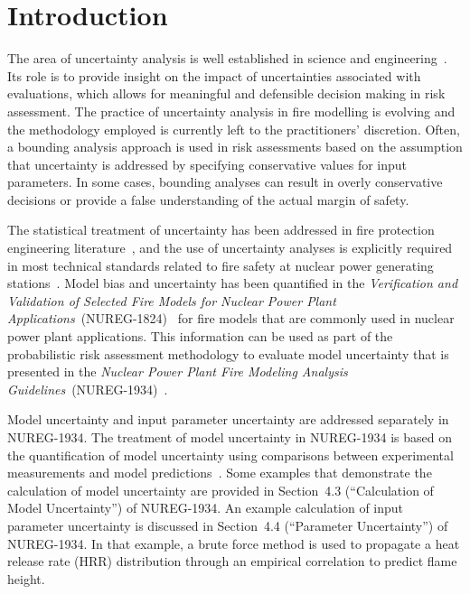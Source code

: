 \documentclass[12pt]{article}
\begin{document}
\section{Introduction}
\label{sec:introduction}

The area of uncertainty analysis is well established in science and engineering~\cite{Morgan, Spiegel, Vose, Kumamoto, Haimes}. Its role is to provide insight on the impact of uncertainties associated with evaluations, which allows for meaningful and defensible decision making in risk assessment. The practice of uncertainty analysis in fire modelling is evolving and the methodology employed is currently left to the practitioners' discretion. Often, a bounding analysis approach is used in risk assessments based on the assumption that uncertainty is addressed by specifying conservative values for input parameters. In some cases, bounding analyses can result in overly conservative decisions or provide a false understanding of the actual margin of safety. 

The statistical treatment of uncertainty has been addressed in fire protection engineering literature~\cite{Notarianni:SFPE, McGrattan2011a, Notarianni:1999, Lundin, Hostikka:2003a, Upadhyay2008}, and the use of uncertainty analyses is explicitly required in most technical standards related to fire safety at nuclear power generating stations~\cite{NFPA:805, NUREG:6850}. Model bias and uncertainty has been quantified in the \emph{Verification and Validation of Selected Fire Models for Nuclear Power Plant Applications}~(NUREG-1824)~\cite{NUREG_1824} for fire models that are commonly used in nuclear power plant applications. This information can be used as part of the probabilistic risk assessment methodology to evaluate model uncertainty that is presented in the \emph{Nuclear Power Plant Fire Modeling Analysis Guidelines}~(NUREG-1934)~\cite{NUREG_1934}. 

Model uncertainty and input parameter uncertainty are addressed separately in NUREG-1934. The treatment of model uncertainty in NUREG-1934 is based on the quantification of model uncertainty using comparisons between experimental measurements and model predictions~\cite{McGrattan2011a}. Some examples that demonstrate the calculation of model uncertainty are provided in Section~4.3 (``Calculation of Model Uncertainty'') of NUREG-1934. An example calculation of input parameter uncertainty is discussed in Section~4.4 (``Parameter Uncertainty'') of NUREG-1934. In that example, a brute force method is used to propagate a heat release rate (HRR) distribution through an empirical correlation to predict flame height.
\end{document}
